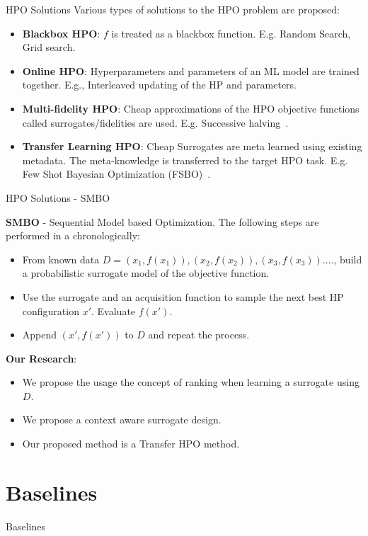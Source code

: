 \documentclass{beamer}
\begin{document}
\begin{frame}[t]{HPO Solutions}
Various types of solutions to the HPO problem are proposed:
\begin{itemize}
\item \textbf{Blackbox HPO}: $f$ is treated as a blackbox function. E.g. Random Search, Grid search.
\item \textbf{Online HPO}: Hyperparameters and parameters of an ML model are trained together. E.g., Interleaved updating of the HP and parameters. 
\item \textbf{Multi-fidelity HPO}: Cheap approximations of the HPO objective functions called surrogates/fidelities are used.
E.g. Successive halving~\cite{successivehalving}.
\item \textbf{Transfer Learning HPO}: Cheap Surrogates are meta learned using existing metadata.
The meta-knowledge is transferred to the target HPO task. 
E.g.  Few Shot Bayesian Optimization (FSBO)~\cite{fsbopaper}.
\end{itemize}
\end{frame}

\begin{frame}[t]{HPO Solutions - SMBO}

\textbf{SMBO} - Sequential Model based Optimization. The following steps are performed in a chronologically:

\begin{itemize}
\item From known data $D = {(x_1, f(x_1)), (x_2, f(x_2)), (x_3, f(x_3)) .... }$, build a probabilistic surrogate model of the objective function.
\item Use the surrogate and an acquisition function to sample the next best HP configuration $x'$. Evaluate $f(x')$.
\item Append $(x', f(x'))$ to $D$ and repeat the process.
\end{itemize}

\textbf{Our Research}:

\begin{itemize}
\item We propose the usage the concept of ranking when learning a surrogate using $D$.
\item We propose a context aware surrogate design.
\item Our proposed method is a Transfer HPO method.
\end{itemize}
\end{frame}


\section{Baselines}
\begin{frame}

\centering
\LARGE{Baselines}

\end{frame}
\end{document}
